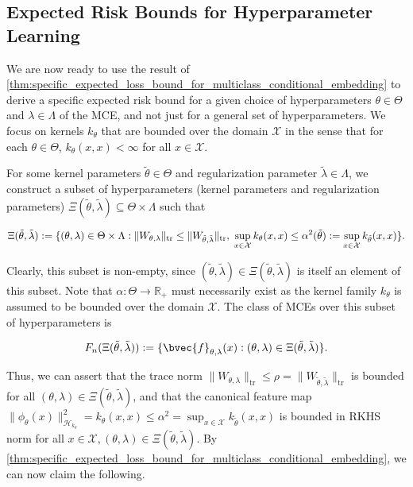 \documentclass{llncs}
\numberwithin{equation}{section}
\numberwithin{table}{section}
\numberwithin{algorithm}{section}
\begin{document}
	\subsection{Expected Risk Bounds for Hyperparameter Learning}
	\label{app:expected_risk_bounds_for_hyperparameter_learning}
	
	We are now ready to use the result of \cref{thm:specific_expected_loss_bound_for_multiclass_conditional_embedding} to derive a specific expected risk bound for a given choice of hyperparameters $\theta \in \Theta$ and $\lambda \in \Lambda$ of the \gls{MCE}, and not just for a general set of hyperparameters. We focus on kernels $k_{\theta}$ that are bounded over the domain $\mathcal{X}$ in the sense that for each $\theta \in \Theta$, $k_{\theta}(x, x) < \infty$ for all $x \in \mathcal{X}$.
	
	For some kernel parameters $\tilde{\theta} \in \Theta$ and regularization parameter $\tilde{\lambda} \in \Lambda$, we construct a subset of hyperparameters (kernel parameters and regularization parameters) $\Xi(\tilde{\theta}, \tilde{\lambda}) \subseteq \Theta \times \Lambda$ such that
	
	\begin{equation}
	\Xi(\tilde{\theta}, \tilde{\lambda}) := \{ (\theta, \lambda) \in \Theta \times \Lambda : \| W_{\theta, \lambda} \|_{\mathrm{tr}} \leq \| W_{\tilde{\theta}, \tilde{\lambda}} \|_{\mathrm{tr}}, \; \sup_{x \in \mathcal{X}} k_{\theta}(x, x) \leq \alpha^{2}(\tilde{\theta}) := \sup_{x \in \mathcal{X}} k_{\tilde{\theta}}(x, x) \}. \\
	\label{eq:hyperparameter_subset_definition}
	\end{equation}
	
	Clearly, this subset is non-empty, since $(\tilde{\theta}, \tilde{\lambda}) \in \Xi(\tilde{\theta}, \tilde{\lambda})$ is itself an element of this subset. Note that $\alpha : \Theta \to \mathbb{R}_{+}$ must necessarily exist as the kernel family $k_{\theta}$ is assumed to be bounded over the domain $\mathcal{X}$. The class of \glspl{MCE} over this subset of hyperparameters is 
	
	\begin{equation}
	F_{n}(\Xi(\tilde{\theta}, \tilde{\lambda})) := \{\bvec{f}_{\theta, \lambda}(x) : (\theta, \lambda) \in \Xi(\tilde{\theta}, \tilde{\lambda}) \}.
	\end{equation}
	
	Thus, we can assert that the trace norm $\| W_{\theta, \lambda} \|_{\mathrm{tr}} \leq \rho = \| W_{\tilde{\theta}, \tilde{\lambda}} \|_{\mathrm{tr}}$ is bounded for all $(\theta, \lambda) \in \Xi(\tilde{\theta}, \tilde{\lambda})$, and that the canonical feature map $\| \phi_{\theta}(x) \|_{\mathcal{H}_{k_{\theta}}}^{2} = k_{\theta}(x, x) \leq \alpha^{2} = \sup_{x \in \mathcal{X}} k_{\tilde{\theta}}(x, x)$ is bounded in \gls{RKHS} norm for all $x \in \mathcal{X}, (\theta, \lambda) \in \Xi(\tilde{\theta}, \tilde{\lambda})$. By \cref{thm:specific_expected_loss_bound_for_multiclass_conditional_embedding}, we can now claim the following.
	
\end{document}
